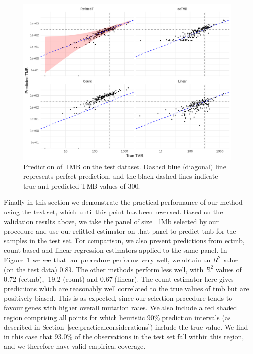 \documentclass[12pt]{article}
\begin{document}
\begin{figure}[htbp]
\centering
\includegraphics[width=6in]{OneMBPanelPredictions.png}
\vspace*{-5mm}
\caption{Prediction of TMB on the test dataset. Dashed blue (diagonal) line represents perfect prediction, and the black dashed lines indicate true and predicted TMB values of 300. %
\label{fig:OneMBPredictions}}
\vspace*{-2mm}
\end{figure} 

Finally in this section we demonstrate the practical performance of our method using the test set, which until this point has been reserved. Based on the validation results above, we take the panel of size ~1Mb selected by our procedure and use our refitted estimator on that panel to predict \acrshort{tmb} for the samples in the test set. For comparison, we also present predictions from \acrshort{ectmb}, count-based and linear regression estimators applied to the same panel. In Figure~\ref{fig:OneMBPredictions} we see that our procedure performs very well; we obtain an $R^2$ value (on the test data) 0.89.  The other methods perform less well, with $R^2$ values of 0.72 (\acrshort{ectmb}), -19.2 (count) and 0.67 (linear). The count estimator here gives predictions which are reasonably well correlated to the true values of \acrshort{tmb} but are positively biased. This is as expected, since our selection procedure tends to favour genes with higher overall mutation rates. 
We also include a red shaded region comprising all points for which heuristic 90\% prediction intervals (as described in Section~\ref{sec:practicalconsiderations}) include the true value. We find in this case that 93.0\% of the observations in the test set fall within this region, and we therefore have valid empirical coverage.
\end{document}
